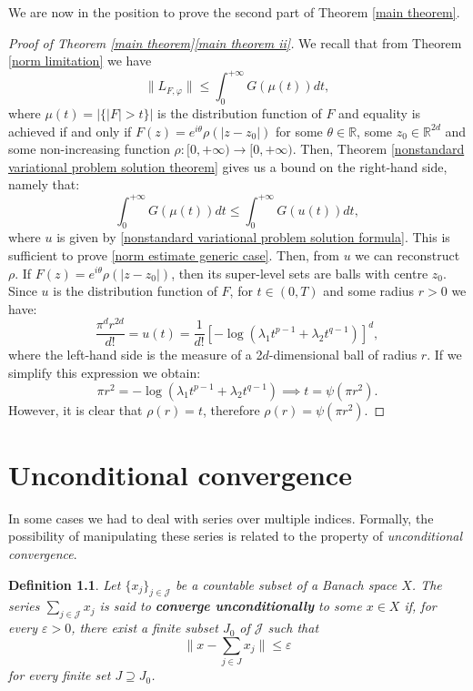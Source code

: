 \documentclass[corpo=11pt, stile=classica, tipotesi=custom,
greek, evenboxes, english]{toptesi}
\numberwithin{equation}{chapter}
\newtheorem{defi}[teo]{Definition}
\theoremstyle{definition}
\theoremstyle{remark}
\newcommand{\R}{\mathbb{R}} %
\begin{document}
We are now in the position to prove the second part of Theorem \eqref{main theorem}.
\begin{proof}[Proof of Theorem \ref{main theorem}\ref{main theorem ii}]
	We recall that from Theorem \ref{norm limitation} we have
	\begin{equation*}
		\|L_{F, \varphi} \| \leq \int_{0}^{+\infty} G(\mu(t))dt,
	\end{equation*}
	where $\mu(t) = |\{|F|>t\}|$ is the distribution function of $F$ and equality is achieved if and only if $F(z) = e^{i \theta} \rho(|z-z_0|)$ for some $\theta \in \R$, some $z_0 \in \R^{2d}$ and some non-increasing function $\rho : [0, +\infty) \rightarrow [0, +\infty)$. Then, Theorem \ref{nonstandard variational problem solution theorem} gives us a bound on the right-hand side, namely that:
	\begin{equation*}
		\int_0^{+\infty} G(\mu(t))dt \leq \int_0^{+\infty} G(u(t)) dt,
	\end{equation*}
	where $u$ is given by \eqref{nonstandard variational problem solution formula}. This is sufficient to prove \eqref{norm estimate generic case}. Then, from $u$ we can reconstruct $\rho$. If $F(z) = e^{i \theta} \rho (|z-z_0|)$, then its super-level sets are balls with centre $z_0$. Since $u$ is the distribution function of $F$, for $t \in (0,T)$ and some radius $r>0$ we have:
	\begin{equation*}
		\dfrac{\pi^d r^{2d}}{d!} = u(t) = \dfrac{1}{d!}\left[ - \log(\lambda_1 t^{p-1} + \lambda_2 t^{q-1})\right]^d,
	\end{equation*}
	where the left-hand side is the measure of a 2$d$-dimensional ball of radius $r$. If we simplify this expression we obtain:
	\begin{equation*}
		\pi r^2 = -\log(\lambda_1 t^{p-1} + \lambda_2 t^{q-1}) \implies t = \psi(\pi r^2).
	\end{equation*}
	However, it is clear that $\rho(r) = t$, therefore $\rho(r) = \psi(\pi r^2)$.
\end{proof}
\appendix
\chapter{Unconditional convergence}
In some cases we had to deal with series over multiple indices. Formally, the possibility of manipulating these series is related to the property of \emph{unconditional convergence}.
\begin{defi}\label{unconditional convergence def}
	Let $\{x_j\}_{j \in \mathcal{J}}$ be a countable subset of a Banach space $X$. The series $\sum_{j \in \mathcal{J}} x_j$ is said to \textbf{converge unconditionally} to some $x \in X$ if, for every $\varepsilon > 0$, there exist a finite subset $J_0$ of $\mathcal{J}$ such that
	\begin{equation*}
		\| x - \sum_{j \in J} x_j \| \leq \varepsilon
	\end{equation*}
	for every finite set $J \supseteq J_0$.
\end{defi}
\end{document}
